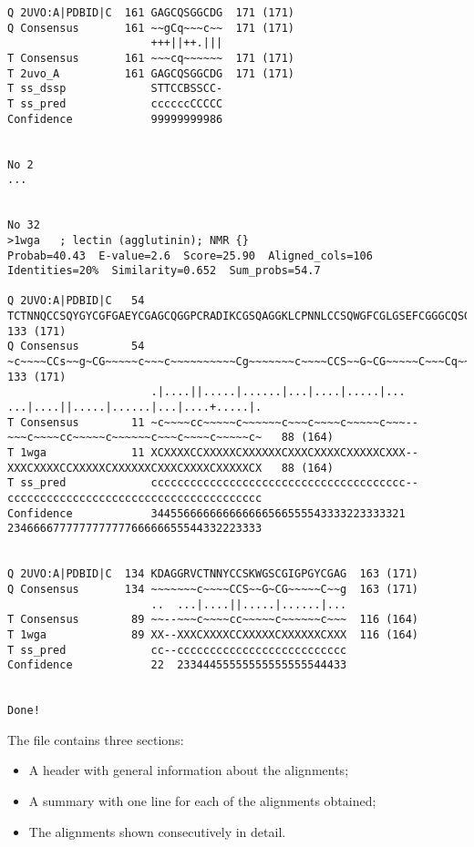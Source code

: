 \begin{verbatim}
Q 2UVO:A|PDBID|C  161 GAGCQSGGCDG  171 (171)
Q Consensus       161 ~~gCq~~~c~~  171 (171)
                      +++||++.|||
T Consensus       161 ~~~cq~~~~~~  171 (171)
T 2uvo_A          161 GAGCQSGGCDG  171 (171)
T ss_dssp             STTCCBSSCC-
T ss_pred             ccccccCCCCC
Confidence            99999999986


No 2
...


No 32
>1wga   ; lectin (agglutinin); NMR {}
Probab=40.43  E-value=2.6  Score=25.90  Aligned_cols=106  Identities=20%  Similarity=0.652  Sum_probs=54.7

Q 2UVO:A|PDBID|C   54 TCTNNQCCSQYGYCGFGAEYCGAGCQGGPCRADIKCGSQAGGKLCPNNLCCSQWGFCGLGSEFCGGGCQSGACSTDKPCG  133 (171)
Q Consensus        54 ~c~~~~CCs~~g~CG~~~~~c~~~c~~~~~~~~~~Cg~~~~~~~c~~~~CCS~~G~CG~~~~~C~~~Cq~~~c~~~~~Cg  133 (171)
                      .|....||.....|......|...|....|.....|...  ...|....||.....|......|...|....+.....|.
T Consensus        11 ~c~~~~cc~~~~~c~~~~~~c~~~c~~~~c~~~~~c~~~--~~~c~~~~cc~~~~~c~~~~~~c~~~c~~~~c~~~~~c~   88 (164)
T 1wga             11 XCXXXXCCXXXXXCXXXXXXCXXXCXXXXCXXXXXCXXX--XXXCXXXXCCXXXXXCXXXXXXCXXXCXXXXCXXXXXCX   88 (164)
T ss_pred             ccccccccccccccccccccccccccccccccccccccc--ccccccccccccccccccccccccccccccccccccccc
Confidence            344556666666666666566555543333223333321  234666677777777777766666655544332223333


Q 2UVO:A|PDBID|C  134 KDAGGRVCTNNYCCSKWGSCGIGPGYCGAG  163 (171)
Q Consensus       134 ~~~~~~~c~~~~CCS~~G~CG~~~~~C~~g  163 (171)
                      ..  ...|....||.....|......|...
T Consensus        89 ~~--~~~c~~~~cc~~~~~c~~~~~~c~~~  116 (164)
T 1wga             89 XX--XXXCXXXXCCXXXXXCXXXXXXCXXX  116 (164)
T ss_pred             cc--cccccccccccccccccccccccccc
Confidence            22  23344455555555555555544433


Done!
\end{verbatim}

The file contains three sections:
\begin{itemize}
\item A header with general information about the alignments;
\item A summary with one line for each of the alignments obtained;
\item The alignments shown consecutively in detail.
\end{itemize}

